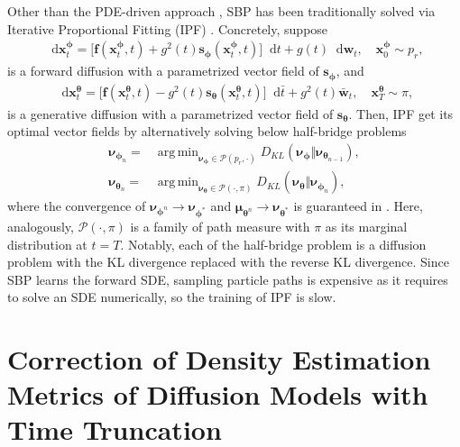\documentclass{article}
\theoremstyle{definition}
\theoremstyle{remark}
\DeclareMathOperator*{\argmin}{arg\,min}
\newcommand*\diff{\mathop{}\!\mathrm{d}}
\begin{document}
	
	Other than the PDE-driven approach \cite{chen2021likelihood}, SBP has been traditionally solved via Iterative Proportional Fitting (IPF) \cite{ruschendorf1995convergence}. Concretely, suppose
	\begin{align}\label{eq:forward_SBP}
	\diff\mathbf{x}_{t}^{\bm{\phi}}=\big[\mathbf{f}(\mathbf{x}_{t}^{\bm{\phi}},t)+g^{2}(t)\mathbf{s}_{\bm{\phi}}(\mathbf{x}_{t}^{\bm{\phi}},t)\big]\diff t+g(t)\diff\mathbf{w}_{t}, \quad\mathbf{x}_{0}^{\bm{\phi}}\sim p_{r},
	\end{align}
	is a forward diffusion with a parametrized vector field of $\mathbf{s}_{\bm{\phi}}$, and
	\begin{align*}
	\diff\mathbf{x}_{t}^{\bm{\theta}}=\big[\mathbf{f}(\mathbf{x}_{t}^{\bm{\theta}},t)-g^{2}(t)\mathbf{s}_{\bm{\theta}}(\mathbf{x}_{t}^{\bm{\theta}},t)\big]\diff \bar{t}+g^{2}(t)\mathbf{\bar{w}}_{t},\quad\mathbf{x}_{T}^{\bm{\theta}}\sim\pi,
	\end{align*}
	is a generative diffusion with a parametrized vector field of $\mathbf{s}_{\bm{\theta}}$. Then, IPF get its optimal vector fields by alternatively solving below half-bridge problems
	\begin{align}
	\bm{\nu}_{\bm{\phi}_{n}}=&\argmin_{\bm{\nu}_{\bm{\phi}}\in\mathcal{P}(p_{r},\cdot)}D_{KL}(\bm{\nu}_{\bm{\phi}}\Vert\bm{\nu}_{\bm{\theta}_{n-1}}),\label{eq:SBP1}\\
	\bm{\nu}_{\bm{\theta}_{n}}=&\argmin_{\bm{\nu}_{\bm{\theta}}\in\mathcal{P}(\cdot,\pi)}D_{KL}(\bm{\nu}_{\bm{\theta}}\Vert\bm{\nu}_{\bm{\phi}_{n}}),\label{eq:SBP2}
	\end{align}
	where the convergence of $\bm{\nu}_{\bm{\phi}^{n}}\rightarrow\bm{\nu}_{\bm{\phi}^{*}}$ and $\bm{\mu}_{\bm{\theta}^{n}}\rightarrow\bm{\nu}_{\bm{\theta}^{*}}$ is guaranteed in \citet{de2021diffusion}. Here, analogously, $\mathcal{P}(\cdot,\pi)$ is a family of path measure with $\pi$ as its marginal distribution at $t=T$. Notably, each of the half-bridge problem is a diffusion problem with the KL divergence replaced with the reverse KL divergence. Since SBP learns the forward SDE, sampling particle paths is expensive as it requires to solve an SDE numerically, so the training of IPF is slow.
	
	
	
	
	
	\section{Correction of Density Estimation Metrics of Diffusion Models with Time Truncation}\label{appendix:correction_of_nll}
	
\end{document}
